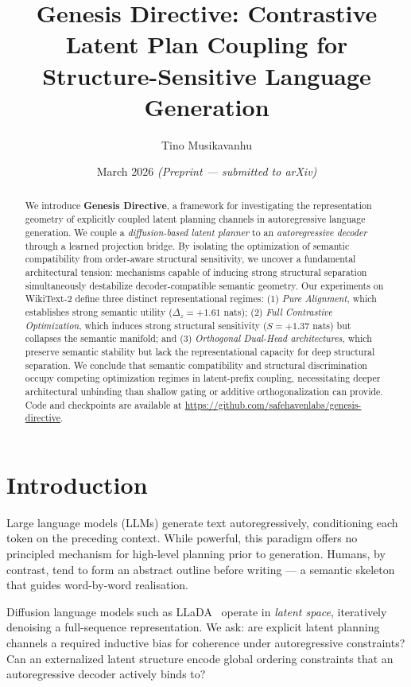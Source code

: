\documentclass[11pt]{article}
\title{
  \textbf{Genesis Directive: Contrastive Latent Plan Coupling for\\
  Structure-Sensitive Language Generation}
}
\author[1]{Tino Musikavanhu}
\affil[1]{Safehaven Labs}
\date{March 2026 \quad\textit{(Preprint — submitted to arXiv)}}
\begin{document}
\maketitle

\begin{abstract}
We introduce \textbf{Genesis Directive}, a framework for investigating the representation geometry of explicitly coupled latent planning channels in autoregressive language generation. We couple a \emph{diffusion-based latent planner} to an \emph{autoregressive decoder} through a learned projection bridge. By isolating the optimization of semantic compatibility from order-aware structural sensitivity, we uncover a fundamental architectural tension: mechanisms capable of inducing strong structural separation simultaneously destabilize decoder-compatible semantic geometry. Our experiments on WikiText-2 define three distinct representational regimes: (1) \emph{Pure Alignment}, which establishes strong semantic utility ($\Delta_z = +1.61$ nats); (2) \emph{Full Contrastive Optimization}, which induces strong structural sensitivity ($S = +1.37$ nats) but collapses the semantic manifold; and (3) \emph{Orthogonal Dual-Head architectures}, which preserve semantic stability but lack the representational capacity for deep structural separation. We conclude that semantic compatibility and structural discrimination occupy competing optimization regimes in latent-prefix coupling, necessitating deeper architectural unbinding than shallow gating or additive orthogonalization can provide. Code and checkpoints are available at \url{https://github.com/safehavenlabs/genesis-directive}.
\end{abstract}

\section{Introduction}
\label{sec:intro}

Large language models (LLMs) generate text autoregressively, conditioning each
token on the preceding context.
While powerful, this paradigm offers no principled mechanism for high-level
planning prior to generation.
Humans, by contrast, tend to form an abstract outline before writing — a
semantic skeleton that guides word-by-word realisation.

Diffusion language models such as LLaDA~\citep{nie2025llada} operate in
\emph{latent space}, iteratively denoising a full-sequence representation.
We ask: are explicit latent planning channels a required inductive bias for 
coherence under autoregressive constraints? Can an externalized latent structure 
encode global ordering constraints that an autoregressive decoder actively binds to?
\end{document}
